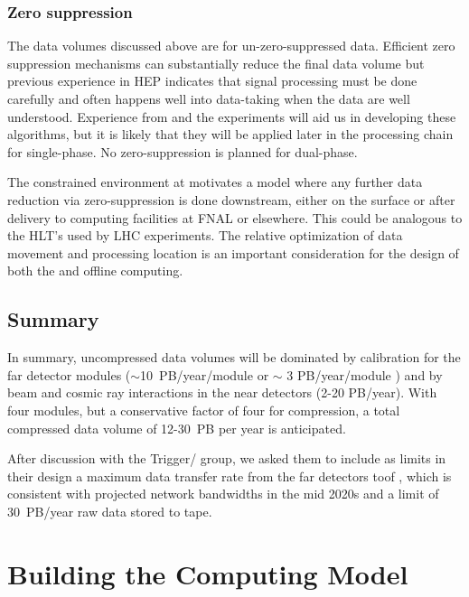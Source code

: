 \subsubsection{Zero suppression}

The data volumes discussed above are for un-zero-suppressed data.  Efficient zero suppression mechanisms can substantially reduce the final data volume but previous experience in HEP indicates that signal processing must be done carefully and often happens well into data-taking when the data are well understood.  Experience from   and the  experiments will aid us in developing these algorithms, but it is likely that they will be applied later in the processing chain for single-phase.  No zero-suppression is planned for dual-phase.

The constrained environment at \surf motivates a model where any further data reduction via zero-suppression is done downstream, either on the surface or after delivery to computing facilities at FNAL or elsewhere. This could be analogous to the HLT's used by LHC experiments. The relative optimization of data movement and processing location is an important consideration for the design of both the  and offline computing.

\subsection{Summary}
In summary, uncompressed data volumes will be dominated by calibration for the far detector modules ($\sim$10~PB/year/module  or $\sim$ 3 PB/year/module ) and by beam and cosmic ray interactions in the near detectors (2-20 PB/year).   With four  modules, but a conservative factor of four for compression, a total compressed data volume of 12-30~PB per year is anticipated. 

After discussion with the  Trigger/ group, we asked them to include as limits in their design a  maximum data transfer rate from the far detectors to\fnal of \surffnalbw, which is consistent with projected network bandwidths in the mid 2020s and a limit of 30~PB/year raw data stored to tape.  



\section{Building the Computing Model}\label{sw:bld-cmp-mdl}

